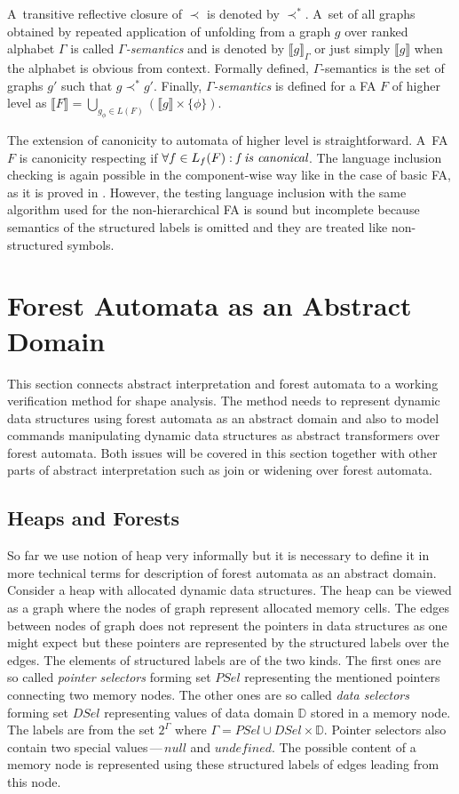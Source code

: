 \documentclass[a4paper, 12pt]{article}
\begin{document}
A~transitive reflective closure of $\prec$ is denoted by $\prec^*$.
A~set of all graphs obtained by repeated application of unfolding from
a graph $g$ over ranked alphabet $\Gamma$ is called \emph{$\Gamma$-semantics}
and is denoted by $\llbracket g \rrbracket_\Gamma$ or just simply $\llbracket g \rrbracket$ when
the alphabet is obvious from context.
Formally defined, $\Gamma$-semantics is the set of graphs $g'$ such that $g \prec^* g'$.
Finally, \emph{$\Gamma$-semantics} is defined for a FA $F$ of higher level as
$\llbracket F \rrbracket = \bigcup_{g_\phi \in L(F)} (\llbracket g \rrbracket \times \{\phi\})$.

The extension of canonicity to automata of higher level is straightforward.
A~FA $F$ is canonicity respecting if $\forall f \in L_f(F): \emph{f is canonical}$.
The language inclusion checking is again possible in the component-wise way like in the case of basic FA,
as it is proved in \cite{cav11}.
However, the testing language inclusion with the same algorithm used for the non-hierarchical FA
is sound but incomplete because semantics of the structured labels is omitted
and they are treated like non-structured symbols.

\section{Forest Automata as an Abstract Domain}
\label{sec:analysis}

This section connects abstract interpretation
and forest automata to a working verification method for shape analysis.
The method needs to represent dynamic data structures
using forest automata as an abstract domain and
also to model commands manipulating dynamic data structures
as abstract transformers over forest automata.
Both issues will be covered in this section together with
other parts of abstract interpretation such as join or widening
over forest automata.

\subsection{Heaps and Forests}
So far we use notion of heap very informally but it is necessary to define
it in more technical terms for description of forest automata as an abstract domain.
Consider a heap with allocated dynamic data structures.
The heap can be viewed as a graph where the nodes of graph represent
allocated memory cells.
The edges between nodes of graph does not represent the pointers in data structures
as one might expect but these pointers are represented by the structured labels over the edges.
The elements of structured labels are of the two kinds.
The first ones are so called \emph{pointer selectors} forming set $PSel$ representing
the mentioned pointers connecting two memory nodes.
The other ones are so called \emph{data selectors} forming set $DSel$ representing
values of data domain $\mathbb{D}$ stored in a memory node.
The labels are from the set $2^\Gamma$ where $\Gamma = PSel \cup DSel \times \mathbb{D}$.
Pointer selectors also contain two special values\,---\,$null$ and $undefined$.
The possible content of a memory node is represented using these structured labels of
edges leading from this node.
\end{document}
